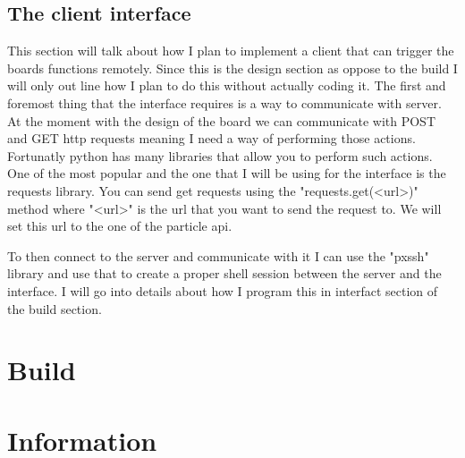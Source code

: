 \documentclass{article}
\begin{document}
\subsection{The client interface}
This section will talk about how I plan to implement a client that can trigger the boards functions
remotely. Since this is the design section as oppose to the build I will only out line how I plan to
do this without actually coding it. The first and foremost thing that the interface requires is a
way to communicate with server. At the moment with the design of the board we can communicate with
POST and GET http requests meaning I need a way of performing those actions. Fortunatly python has
many libraries that allow you to perform such actions. One of the most popular and the one that I
will be using for the interface is the requests library\cite{pythonRequests}. You can send get
requests using the "requests.get(<url>)" method where "<url>" is the url that you want to send the
request to. We will set this url to the one of the particle api.

To then connect to the server and communicate with it I can use the "pxssh" library and use that to
create a proper shell session between the server and the interface. I will go into details about
how I program this in interfact section of the build section.


\pagebreak

\section{Build}

\section{Information}
\end{document}
